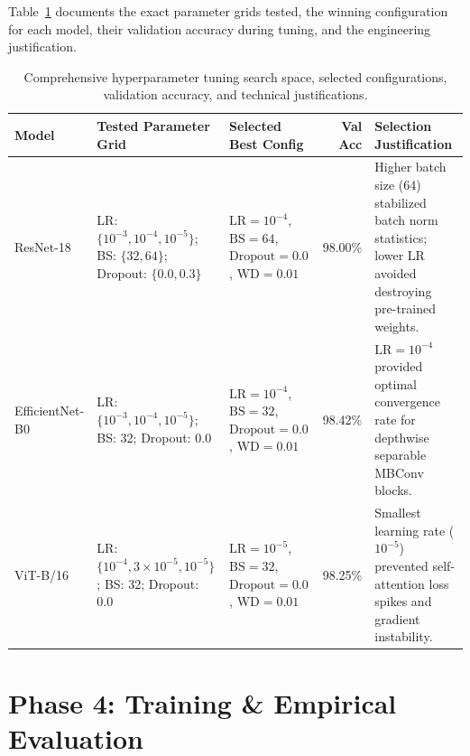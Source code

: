 \documentclass[11pt,a4paper]{article}
\begin{document}
Table~\ref{tab:hyperparameter_tuning} documents the exact parameter grids tested, the winning configuration for each model, their validation accuracy during tuning, and the engineering justification.

\begin{table}[H]
\centering
\small
\begin{tabular}{@{}p{2.3cm}p{3.8cm}p{3.1cm}r p{4.2cm}@{}}
\toprule
\textbf{Model} & \textbf{Tested Parameter Grid} & \textbf{Selected Best Config} & \textbf{Val Acc} & \textbf{Selection Justification} \\
\midrule
ResNet-18 & 
LR: $\{10^{-3}, 10^{-4}, 10^{-5}\}$; \newline
BS: $\{32, 64\}$; \newline
Dropout: $\{0.0, 0.3\}$ & 
$\text{LR}=10^{-4}$, $\text{BS}=64$, \newline
$\text{Dropout}=0.0$, $\text{WD}=0.01$ & 
98.00\% & 
Higher batch size (64) stabilized batch norm statistics; lower LR avoided destroying pre-trained weights. \\
\midrule
EfficientNet-B0 & 
LR: $\{10^{-3}, 10^{-4}, 10^{-5}\}$; \newline
BS: 32; Dropout: 0.0 & 
$\text{LR}=10^{-4}$, $\text{BS}=32$, \newline
$\text{Dropout}=0.0$, $\text{WD}=0.01$ & 
98.42\% & 
$\text{LR}=10^{-4}$ provided optimal convergence rate for depthwise separable MBConv blocks. \\
\midrule
ViT-B/16 & 
LR: $\{10^{-4}, 3\times10^{-5}, 10^{-5}\}$; \newline
BS: 32; Dropout: 0.0 & 
$\text{LR}=10^{-5}$, $\text{BS}=32$, \newline
$\text{Dropout}=0.0$, $\text{WD}=0.01$ & 
98.25\% & 
Smallest learning rate ($10^{-5}$) prevented self-attention loss spikes and gradient instability. \\
\bottomrule
\end{tabular}
\caption{Comprehensive hyperparameter tuning search space, selected configurations, validation accuracy, and technical justifications.}
\label{tab:hyperparameter_tuning}
\end{table}

\section{Phase 4: Training \& Empirical Evaluation}
\end{document}
